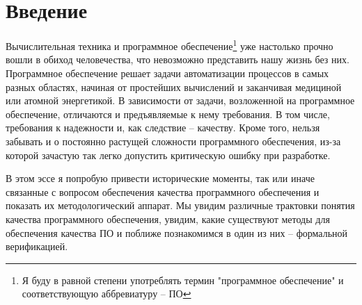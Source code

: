 \section{Введение}

Вычислительная техника и программное обеспечение\footnote{Я буду в равной степени употреблять термин "программное обеспечение" и соответствующую аббревиатуру -- ПО} уже настолько прочно вошли в обиход человечества, что невозможно представить нашу жизнь без них. Программное обеспечение решает задачи автоматизации процессов в самых разных областях, начиная от простейших вычислений и заканчивая медициной или атомной энергетикой. В зависимости от задачи, возложенной на программное обеспечение, отличаются и предъявляемые к нему требования. В том числе, требования к надежности и, как следствие -- качеству. Кроме того, нельзя забывать и о постоянно растущей сложности программного обеспечения, из-за которой зачастую так легко допустить критическую ошибку при разработке.

В этом эссе я попробую привести исторические моменты, так или иначе связанные с вопросом обеспечения качества программного обеспечения и показать их методологический аппарат. Мы увидим различные трактовки понятия качества программного обеспечения, увидим, какие существуют методы для обеспечения качества ПО и поближе познакомимся в один из них -- формальной верификацией.
